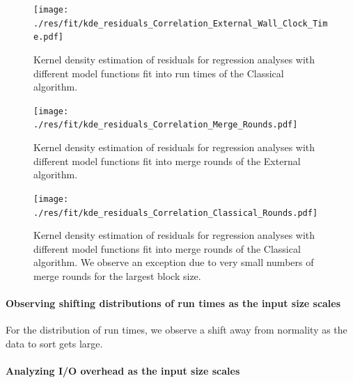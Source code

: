\documentclass[twocolumn]{article}
\begin{document}
\begin{figure}[htb]
    \begin{minipage}{0.475 \textwidth}
        \centering
        \texttt{[image: ./res/fit/kde\_residuals\_Correlation\_External\_Wall\_Clock\_Time.pdf]}
        \caption{Kernel density estimation of residuals for regression analyses with different model functions fit into run times of the Classical algorithm.}
        \label{fig:kde_residuals_Correlation_Classical_Wall_Clock_Time.pdf}
    \end{minipage}
\end{figure}

\begin{figure}[htb]
    \begin{minipage}{0.475 \textwidth}
        \centering
        \texttt{[image: ./res/fit/kde\_residuals\_Correlation\_Merge\_Rounds.pdf]}
        \caption{Kernel density estimation of residuals for regression analyses with different model functions fit into merge rounds of the External algorithm.}
        \label{fig:kde_residuals_Correlation_Merge_Rounds.pdf}
    \end{minipage}
\end{figure}

\begin{figure}[htb]
    \begin{minipage}{0.475 \textwidth}
        \centering
        \texttt{[image: ./res/fit/kde\_residuals\_Correlation\_Classical\_Rounds.pdf]}
        \caption{Kernel density estimation of residuals for regression analyses with different model functions fit into merge rounds of the Classical algorithm. We observe an exception due to very small numbers of merge rounds for the largest block size.}
        \label{fig:kde_residuals_Correlation_Classical_Rounds.pdf}
    \end{minipage}
\end{figure}

\paragraph*{Observing shifting distributions of run times as the input size scales}
For the distribution of run times, we observe a shift away from normality as the data to sort gets large.

\paragraph*{Analyzing I/O overhead as the input size scales}
\end{document}
